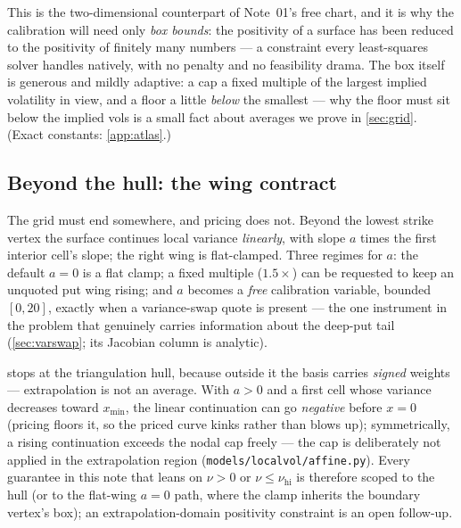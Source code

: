 \documentclass[11pt]{article}
\begin{document}
This is the two-dimensional counterpart of Note~01's free chart, and it is
why the calibration will need only \emph{box bounds}: the positivity of a
surface has been reduced to the positivity of finitely many numbers --- a
constraint every least-squares solver handles natively, with no penalty
and no feasibility drama.  The box itself is generous and mildly adaptive:
a cap a fixed multiple of the largest implied volatility in view, and a
floor a little \emph{below} the smallest --- why the floor must sit below
the implied vols is a small fact about averages we prove in
\cref{sec:grid}.  (Exact constants: \cref{app:atlas}.)

\subsection{Beyond the hull: the wing contract}

The grid must end somewhere, and pricing does not.  Beyond the lowest
strike vertex the surface continues local variance \emph{linearly}, with
slope $a$ times the first interior cell's slope; the right wing is
flat-clamped.  Three regimes for $a$: the default $a=0$ is a flat clamp; a
fixed multiple ($1.5\times$) can be requested to keep an unquoted put wing
rising; and $a$ becomes a \emph{free} calibration variable, bounded
$[0,20]$, exactly when a variance-swap quote is present --- the one
instrument in the problem that genuinely carries information about the
deep-put tail (\cref{sec:varswap}; its Jacobian column is analytic).

\begin{caution}[title={Caution: the extrapolation is outside the positivity
guarantee}]
 stops at the triangulation hull, because outside it the
basis carries \emph{signed} weights --- extrapolation is not an average.
With $a>0$ and a first cell whose variance decreases toward $x_{\min}$, the
linear continuation can go \emph{negative} before $x=0$ (pricing floors it,
so the priced curve kinks rather than blows up); symmetrically, a rising
continuation exceeds the nodal cap freely --- the cap is deliberately not
applied in the extrapolation region (\nolinkurl{models/localvol/affine.py}).
Every guarantee in this note that leans on $\nu>0$ or
$\nu\le\nu_{\mathrm{hi}}$ is therefore scoped to the hull (or to the
flat-wing $a=0$ path, where the clamp inherits the boundary vertex's box);
an extrapolation-domain positivity constraint is an open follow-up.
\end{caution}
\end{document}
